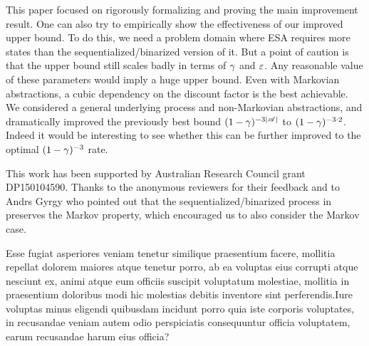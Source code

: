 \documentclass{article} %
\renewcommand{\bibstylename}{aaai21} %
\renewcommand{\bibstylename}{apalike}
\renewcommand{\bibstylename}{unsrtnat}
\begin{document}
This paper focused on rigorously formalizing and proving the main improvement result. One can also try to empirically show the effectiveness of our improved upper bound. To do this, we need a problem domain where ESA requires more states than the sequentialized/binarized version of it. But a point of caution is that the upper bound still scales badly in terms of $\gamma$ and $\varepsilon$. Any reasonable value of these parameters would imply a huge upper bound.
Even with Markovian abstractions, a cubic dependency on the discount factor is the best achievable.
We considered a general underlying process and non-Markovian abstractions,
and dramatically improved the previously best bound $(1-\gamma)^{-3|\mathscr{A}|}$ to $(1-\gamma)^{-3\cdot 2}$.
Indeed it would be interesting to see whether this can be further improved to the optimal $(1-\gamma)^{-3}$ rate.

This work has been supported by Australian Research Council grant  DP150104590. Thanks to the anonymous reviewers for their feedback and to Andrs Gyrgy who pointed out that the sequentialized/binarized process in  preserves the Markov property, which encouraged us to also consider the Markov case.

\begin{small}

Esse fugiat asperiores veniam tenetur similique praesentium facere, mollitia repellat dolorem maiores atque tenetur porro, ab ea voluptas eius corrupti atque nesciunt ex, animi atque eum officiis suscipit voluptatum molestiae, mollitia in praesentium doloribus modi hic molestias debitis inventore sint perferendis.Iure voluptas minus eligendi quibusdam incidunt porro quia iste corporis voluptates, in recusandae veniam autem odio perspiciatis consequuntur officia voluptatem, earum recusandae harum eius officia?\clearpage

\end{small}
\end{document}
